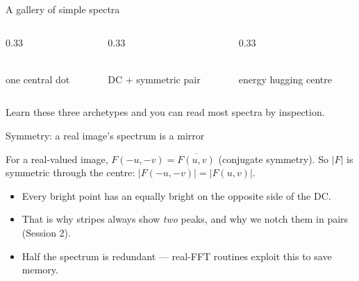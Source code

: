 \documentclass[10pt,aspectratio=169]{beamer}
\begin{document}
\begin{frame}{A gallery of simple spectra}
  \begin{columns}[T]
    \begin{column}{0.33\textwidth}\begin{center}
      \\{\scriptsize one central dot}
    \end{center}\end{column}
    \begin{column}{0.33\textwidth}\begin{center}
      \\{\scriptsize DC + symmetric pair}
    \end{center}\end{column}
    \begin{column}{0.33\textwidth}\begin{center}
      \\{\scriptsize energy hugging centre}
    \end{center}\end{column}
  \end{columns}
  \vspace{4pt}
  Learn these three archetypes and you can read most spectra by inspection.
\end{frame}

\begin{frame}{Symmetry: a real image's spectrum is a mirror}
  \begin{mathbox}
    For a real-valued image, $F(-u,-v) = \overline{F(u,v)}$ (conjugate symmetry).
    So $|F|$ is symmetric through the centre: $|F(-u,-v)| = |F(u,v)|$.
  \end{mathbox}
  \begin{itemize}
    \item Every bright point has an equally bright  on the opposite side of the DC.
    \item That is why stripes always show \emph{two} peaks, and why we notch them in pairs (Session 2).
    \item Half the spectrum is redundant — real-FFT routines exploit this to save memory.
  \end{itemize}
\end{frame}
\end{document}
